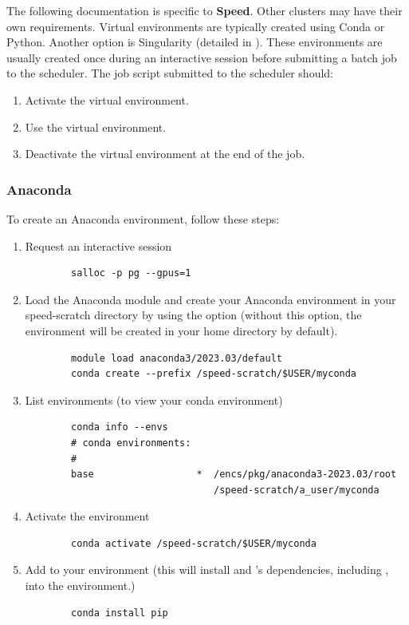 \documentclass{easychair}
\begin{document}
The following documentation is specific to \textbf{Speed}.
Other clusters may have their own requirements.
%
Virtual environments are typically created using Conda or Python.
Another option is Singularity (detailed in ).
These environments are usually created once during an interactive session 
before submitting a batch job to the scheduler. 
%
The job script submitted to the scheduler should:
\begin{enumerate}
	\item Activate the virtual environment.
	\item Use the virtual environment.
	\item Deactivate the virtual environment at the end of the job.
\end{enumerate}

\subsubsection{Anaconda}
\label{sect:conda-venv}

To create an Anaconda environment, follow these steps:
\begin{enumerate}
	\item Request an interactive session
	\begin{verbatim}
		salloc -p pg --gpus=1
	\end{verbatim}

	\item
	Load the Anaconda module and create your Anaconda environment in your speed-scratch directory by using 
	the  option (without this option, the environment will be created in your home directory by default).
	\begin{verbatim}
		module load anaconda3/2023.03/default
		conda create --prefix /speed-scratch/$USER/myconda
	\end{verbatim}

	\item
	List environments (to view your conda environment)
	\begin{verbatim}
		conda info --envs
		# conda environments:
		#
		base                  *  /encs/pkg/anaconda3-2023.03/root
                         		 /speed-scratch/a_user/myconda
	\end{verbatim}

	\item
	Activate the environment
	\begin{verbatim}
		conda activate /speed-scratch/$USER/myconda
	\end{verbatim}

	\item
	Add  to your environment (this will install  and 's dependencies,
	including , into the environment.)
	\begin{verbatim}
		conda install pip
	\end{verbatim}
\end{enumerate}   
\end{document}
